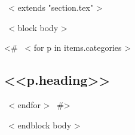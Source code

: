 ~< extends "section.tex" >~

~< block body >~
\renewcommand*{\bibfont}{\small}

<#
~< for p in items.categories >~
\subsection{<<p.heading>>}
\begin{refsection}
  \nocite{*}
  \printbibliography[heading=none,prefixnumbers=<<p.prefix>>]
\end{refsection}
~< endfor >~
#>

\begin{refsection}
  \nocite{*}
  \printbibliography[heading=none,prefixnumbers=]
\end{refsection}

~< endblock body >~
